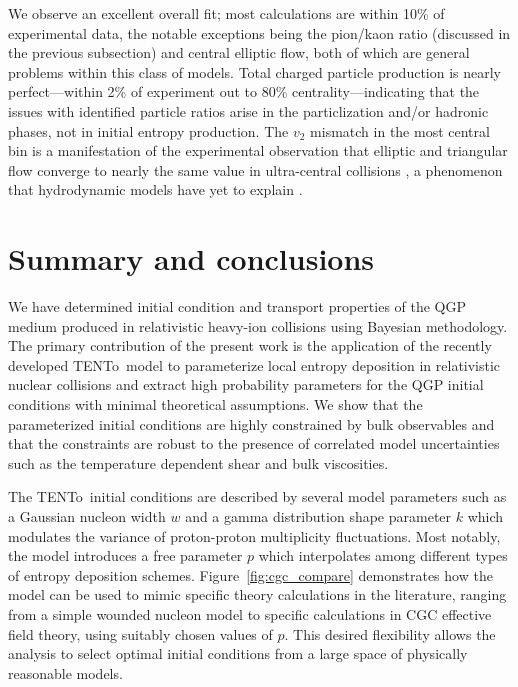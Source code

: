 \documentclass[aps,prc,reprint,amsmath,nofootinbib,superscriptaddress]{revtex4-1}
\newcommand{\trento}{T\raisebox{-0.5ex}{R}ENTo}
\begin{document}
We observe an excellent overall fit; most calculations are within 10\% of experimental data, the notable exceptions being the pion/kaon ratio (discussed in the previous subsection) and central elliptic flow, both of which are general problems within this class of models.
Total charged particle production is nearly perfect---within 2\% of experiment out to 80\% centrality---indicating that the issues with identified particle ratios arise in the particlization and/or hadronic phases, not in initial entropy production.
The $v_2$ mismatch in the most central bin is a manifestation of the experimental observation that elliptic and triangular flow converge to nearly the same value in ultra-central collisions \cite{CMS:2013bza}, a phenomenon that hydrodynamic models have yet to explain \cite{Denicol:2014ywa,Shen:2015qta}.


\section{Summary and conclusions}

We have determined initial condition and transport properties of the QGP medium produced in relativistic heavy-ion collisions using Bayesian methodology.
The primary contribution of the present work is the application of the recently developed \trento\ model to parameterize local entropy deposition in relativistic nuclear collisions and extract high probability parameters for the QGP initial conditions with minimal theoretical assumptions.
We show that the parameterized initial conditions are highly constrained by bulk observables and that the constraints are robust to the presence of correlated model uncertainties such as the temperature dependent shear and bulk viscosities.

The \trento\ initial conditions are described by several model parameters such as a Gaussian nucleon width $w$ and a gamma distribution shape parameter $k$ which modulates the variance of proton-proton multiplicity fluctuations.
Most notably, the model introduces a free parameter $p$ which interpolates among different types of entropy deposition schemes.
Figure~\ref{fig:cgc_compare} demonstrates how the model can be used to mimic specific theory calculations in the literature, ranging from a simple wounded nucleon model to specific calculations in CGC effective field theory, using suitably chosen values of $p$.
This desired flexibility allows the analysis to select optimal initial conditions from a large space of physically reasonable models.
\end{document}
